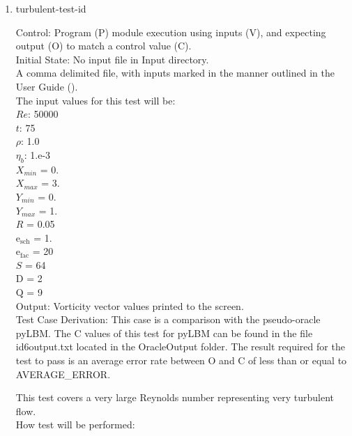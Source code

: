 \documentclass[12pt, titlepage]{article}
\newcounter{testcounter} %
\begin{document}
\begin{enumerate}
\item{turbulent-test-id\thetestcounter \\}

Control: Program (P) module execution using inputs (V), and expecting output (O)
to match a control value (C).\\
					
Initial State: No input file in Input directory.\\
					
A comma delimited file, with inputs marked in the manner outlined in the User
Guide (\citet{LBM_UserGuide_PM}).\\The input values for this test will be:\\
$Re$: 50000\\
$t$: 75\\
$\rho$: 1.0\\
$\eta_b$: 1.e-3\\
$X_{min}$ = 0.\\
$X_{max}$ = 3.\\
$Y_{min}$ = 0.\\
$Y_{max}$ = 1.\\
$R$ = 0.05\\
$\mathrm{e_{sch}}$ = 1.\\
$\mathrm{e_{fac}}$ = 20\\
$S$ = 64\\
$\mathrm{D}$ = 2\\
$\mathrm{Q}$ = 9\\

Output: Vorticity vector values printed to the screen. \\

Test Case Derivation: This case is a comparison with the pseudo-oracle
pyLBM. The C values of this test for pyLBM can be found in the file
id6output.txt located in the OracleOutput folder. The result required for the
test to pass is an average error rate between O and C of less than or equal to
AVERAGE\_ERROR.

This test covers a very large Reynolds number representing very turbulent flow.\\	
					
How test will be performed: 


\end{enumerate}
\end{document}
